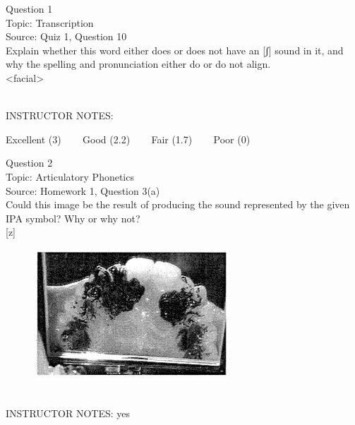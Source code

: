 \documentclass[12pt]{article}
\begin{document}
\begin{center}
\textbf{{\color{blue}{\HUGE START OF EXAM\\}}}

\textbf{{\color{blue}{\HUGE Student ID: 34548\\}}}

\textbf{{\color{blue}{\HUGE \\}}}

\end{center}
\newpage

{\large Question 1}\\

Topic: Transcription\\
Source: Quiz 1, Question 10\\

Explain whether this word either does or does not have an [ʃ] sound in it, and why the spelling and pronunciation either do or do not align.\\

<facial>


~\\
INSTRUCTOR NOTES: 


\vfill
Excellent (3) ~~~ Good (2.2) ~~~ Fair (1.7) ~~~ Poor (0)
\newpage

{\large Question 2}\\

Topic: Articulatory Phonetics\\
Source: Homework 1, Question 3(a)\\

Could this image be the result of producing the sound represented by the given IPA symbol? Why or why not?\\

{[z]}

\begin{figure}[H]
\includegraphics{../images/staticpalatography_fricative.png}
\end{figure}

~\\
INSTRUCTOR NOTES: yes
\end{document}
